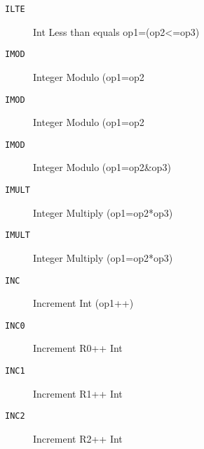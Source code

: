
\begin{description}
\item[\texttt{ILTE       }]  Int Less than equals op1=(op2<=op3)\\
\end{description}

\begin{description}
\item[\texttt{IMOD       }]  Integer Modulo (op1=op2%
\end{description}

\begin{description}
\item[\texttt{IMOD       }]  Integer Modulo (op1=op2%
\end{description}

\begin{description}
\item[\texttt{IMOD       }]  Integer Modulo (op1=op2\&op3)\\
\end{description}

\begin{description}
\item[\texttt{IMULT      }]  Integer Multiply (op1=op2*op3)\\
\end{description}

\begin{description}
\item[\texttt{IMULT      }]  Integer Multiply (op1=op2*op3)\\
\end{description}

\begin{description}
\item[\texttt{INC        }]  Increment Int (op1++)\\
\end{description}

\begin{description}
\item[\texttt{INC0       }]  Increment R0++ Int\\
\end{description}

\begin{description}
\item[\texttt{INC1       }]  Increment R1++ Int\\
\end{description}

\begin{description}
\item[\texttt{INC2       }]  Increment R2++ Int\\
\end{description}
